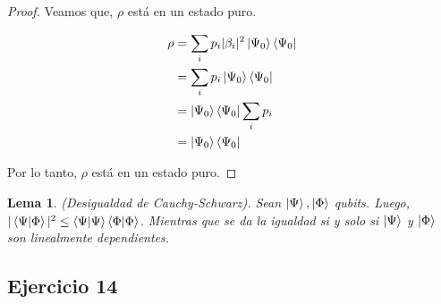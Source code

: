 \documentclass[a4paper,11pt]{article}
\newtheorem{lemma}[theorem2]{Lema}
\begin{document}
\begin{proof}
Veamos que, $\rho$ está en un estado puro.

\begin{align*}
  \rho 
  &= \sum_{i} p_i |\beta_i|^2 \left\vert{\Psi_0}\right\rangle \left\langle{\Psi_0}\right\vert
  \\ &=  \sum_{i} p_i \left\vert{\Psi_0}\right\rangle \left\langle{\Psi_0}\right\vert
  \\ &= \left\vert{\Psi_0}\right\rangle \left\langle{\Psi_0}\right\vert \sum_{i} p_i
  \\ &= \left\vert{\Psi_0}\right\rangle \left\langle{\Psi_0}\right\vert
\end{align*}

Por lo tanto, $\rho$ está en un estado puro.

\end{proof}



\begin{lemma}
(Desigualdad de Cauchy-Schwarz).
Sean $\left\vert{\Psi}\right\rangle, \left\vert{\Phi}\right\rangle$ qubits. Luego, $|\braket{\Psi | \Phi}|^2 \leq \braket{\Psi | \Psi} \braket{\Phi | \Phi}$.
Mientras que se da la igualdad si y solo si $\left\vert{\Psi}\right\rangle$ y $\left\vert{\Phi}\right\rangle$ son linealmente dependientes. 
\end{lemma}

\subsection*{Ejercicio 14}
\end{document}
